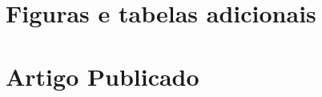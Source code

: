 \documentclass[
	12pt,				%
	oneside,
	a4paper,			%
	english,			%
	spanish,			%
	brazil				%
	]{abntex2}
\begin{document}
\postextual

\label{references}

%
%


\begin{apendicesenv}

\partapendices

\chapter{Figuras e tabelas adicionais}




\chapter{Artigo Publicado}



\end{apendicesenv}



\end{document}
